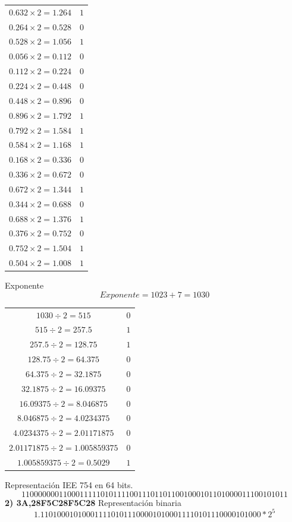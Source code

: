 \documentclass[12pt]{article}
\begin{document}
\begin{center}
\begin{tabular}{|c|c|}
        $0.632 \times 2 = 1.264$ & $1$\\
        $0.264\times 2 = 0.528$ & $0$\\
        $0.528 \times 2 = 1.056$ & $1$\\
        $0.056 \times 2 = 0.112$ & $0$\\
        $0.112 \times 2 = 0.224$ & $0$\\ %
        $0.224\times 2 = 0.448$ & $0$\\
        $0.448 \times 2 = 0.896$ & $0$\\
        $0.896\times 2 = 1.792$ & $1$\\
        $0.792 \times 2 = 1.584$ & $1$\\
        $0.584 \times 2 = 1.168$ & $1$\\
        $0.168 \times 2 = 0.336$ & $0$\\ %
        $0.336 \times 2 = 0.672$ & $0$\\ 
        $0.672\times 2 = 1.344$ & $1$\\
        $0.344 \times 2 = 0.688$ & $0$\\
        $0.688\times 2 = 1.376$ & $1$\\
        $0.376 \times 2 = 0.752$ & $0$\\
        $0.752 \times 2 = 1.504$ & $1$\\
        $0.504 \times 2 = 1.008$ & $1$\\ %

        \hline
      \end{tabular} 
\end{center}
Exponente
$$Exponente= 1023+7=1030$$
\begin{center}
    \begin{tabular}{|c|c|}
        \hline
        $1030 \div 2 = 515$ & $0$\\
        $515 \div 2 = 257.5$ & $1$\\
        $257.5 \div 2 = 128.75$ & $1$\\
        $128.75 \div 2 = 64.375$ & $0$\\
        $64.375 \div 2 = 32.1875$ & $0$\\
        $32.1875 \div 2 = 16.09375$ & $0$\\
        $16.09375 \div 2 = 8.046875$ & $0$\\
        $8.046875 \div 2 = 4.0234375$ & $0$\\
        $4.0234375 \div 2 = 2.01171875$ & $0$\\
        $2.01171875 \div 2 = 1.005859375$ & $0$\\
        $1.005859375 \div 2 = 0.5029$ & $1$\\
        \hline
      \end{tabular} 
\end{center}
Representación IEE 754 en 64 bits.
$$1100000001100011111010111100111011011001000101101000011100101011$$
\large{\textbf{2) 3A,28F5C28F5C28}}
\normalsize
\newline Representación binaria
$$1.1 1010 0010 1000 1111 0101 1100 0010 1000 1111 0101 1100 0010 1000*2^5$$
\end{document}
